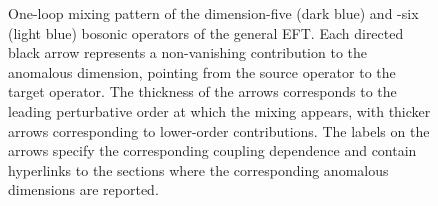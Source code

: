 \begin{figure}[tpb]
{
    }
\endgroup
\caption[One-loop mixing pattern of the dimension-five and dimension-six bosonic operators of the general effective field theory]{One-loop mixing pattern of the dimension-five (dark blue) and -six (light blue) bosonic operators of the general EFT. Each directed black arrow represents a non-vanishing contribution to the anomalous dimension, pointing from the source operator to the target operator. The thickness of the arrows corresponds to the leading perturbative order at which the mixing appears, with thicker arrows corresponding to lower-order contributions. The labels on the arrows specify the corresponding coupling dependence and contain hyperlinks to the sections where the corresponding anomalous dimensions are reported.\label{fig:graph}}
\end{figure}
%